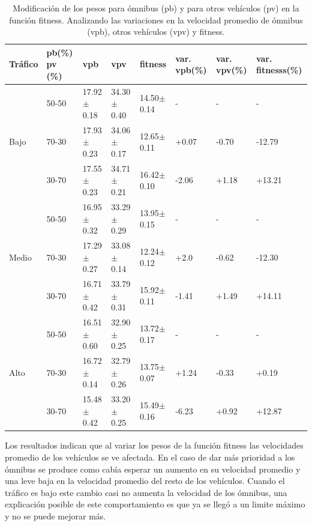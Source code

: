 \begin{table}[H]
	\renewcommand{\arraystretch}{1.2}
	\caption{Modificación de los pesos para ómnibus (pb) y para otros vehículos (pv) en la función fitness. Analizando las variaciones en la velocidad promedio de ómnibus (vpb),  otros vehículos (vpv) y fitness. }
	\label{table:analisis_fitness}
	\centering
	\begin{tabular}{p{1cm}p{1.2cm}p{1.8cm}p{1.8cm}p{1.8cm}p{1.2cm}p{1.2cm}p{1.2cm} }
		\hline
		Tráfico &
		pb(\%) pv (\%)& 
		vpb & 
		vpv &
		fitness &
		var. \newline vpb(\%) &
		var. \newline vpv(\%) &
		var. \newline fitnesss(\%)
		\\ 
		\hline
		& 50-50  & 17.92$\pm$0.18 & 34.30$\pm$0.40 & 14.50$\pm$0.14  &- & - & -\\		
		Bajo & 70-30  & 17.93$\pm$0.23 & 34.06$\pm$0.17 & 12.65$\pm$0.11  & +0.07 & -0.70 & -12.79\\		
		& 30-70 & 17.55$\pm$0.23 & 34.71$\pm$0.21 & 16.42$\pm$0.10  & -2.06 & +1.18 & +13.21\\
		\hline
		
		& 50-50  & 16.95$\pm$0.32 & 33.29$\pm$0.29 & 13.95$\pm$0.15  &- & - & -\\		
		Medio & 70-30  & 17.29$\pm$0.27 & 33.08$\pm$0.14 & 12.24$\pm$0.12  & +2.0 & -0.62 & -12.30\\		
		& 30-70 & 16.71$\pm$0.42 & 33.79$\pm$0.31 & 15.92$\pm$0.11  & -1.41 & +1.49& +14.11\\
		
		\hline
		& 50-50  & 16.51$\pm$0.60 & 32.90$\pm$0.25 & 13.72$\pm$0.17  &- & - & -\\		
		Alto & 70-30  & 16.72$\pm$0.14 & 32.79$\pm$0.26 & 13.75$\pm$0.07  & +1.24 & -0.33 & +0.19\\	
		& 30-70 & 15.48$\pm$0.42 & 33.20$\pm$0.25 & 15.49$\pm$0.16  & -6.23 & +0.92 & +12.87\\
		\hline
			
				

		

	\end{tabular}
\end{table}


Los resultados indican que al variar los pesos de la función fitness las velocidades promedio de los vehículos se ve afectada. En el caso de dar más prioridad a los ómnibus se produce como cabía esperar un aumento en su velocidad promedio y una leve baja en la velocidad promedio del resto de los vehículos. Cuando el tráfico es bajo este cambio casi no aumenta la velocidad de los ómnibus, una explicación posible de este comportamiento es que ya se llegó a un limite máximo y no se puede mejorar más.

